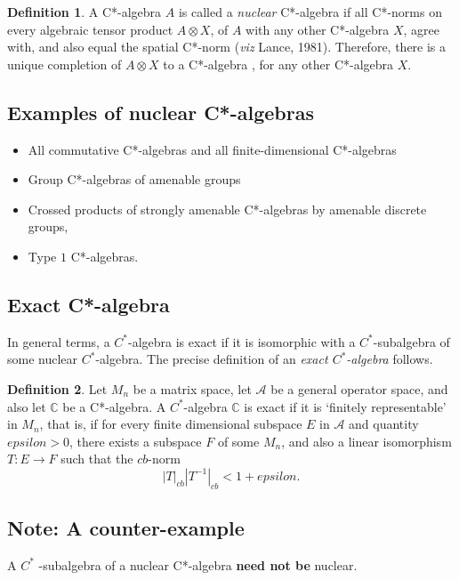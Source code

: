 \documentclass[12pt]{article}
\theoremstyle{plain}
\theoremstyle{definition}
\newtheorem{definition}{Definition}[section]
\numberwithin{equation}{section}
\newcommand{\<}{{\langle}}
\begin{document}
\begin{definition} A C*-algebra $A$ is called a {\em nuclear} C*-algebra if all C*-norms on every algebraic tensor product $A \otimes X$, of $A$ with any other C*-algebra $X$, agree with, and also equal the spatial C*-norm (\emph{viz} Lance, 1981). Therefore, there is a unique completion of $A \otimes X$ to a C*-algebra , for any other C*-algebra $X$.
\end{definition}

\subsection{Examples of nuclear C*-algebras}

\begin{itemize}
\item All commutative C*-algebras and all finite-dimensional C*-algebras 
\item Group C*-algebras of amenable groups
\item Crossed products of strongly amenable C*-algebras by amenable discrete groups,
\item Type $1$ C*-algebras.
\end{itemize}

\subsection{Exact C*-algebra}
  In general terms,  a $C^*$-algebra is exact if it is isomorphic with a $C^*$-subalgebra of some nuclear $C^*$-algebra. The precise definition of an \emph{exact $C^*$-algebra} follows.

\begin{definition}
Let $M_n$ be a matrix space, let $\mathcal{A}$ be a general operator space, and also let $\mathbb{C}$ be a C*-algebra.
A $C^*$-algebra $\mathbb{C}$ is exact if it is `finitely representable' in $M_n$, that is, if for every finite dimensional subspace $E$ in $\mathcal{A}$ and quantity $epsilon > 0$, there exists a subspace $F$ of some $M_n$, and
also a linear isomorphism $T:E \to F$ such that the $cb$-norm 
$$|T|_{cb}|T^{-1}|_{cb} < 1 + epsilon.$$ 
\end{definition}

\subsection{Note: A counter-example} 
 
A $C^*$ -subalgebra of a nuclear C*-algebra \textbf{need not be} nuclear.
\end{document}
